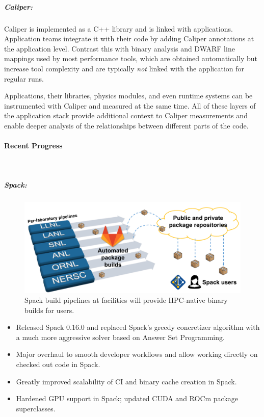 \subparagraph{Caliper:}
Caliper is implemented as a C++ library and is linked with applications.
Application teams integrate it with their code by adding Caliper
annotations at the application level.  Contrast this with binary analysis
and DWARF line mappings used by most performance tools, which are
obtained automatically but increase tool complexity and are typically
{\it not} linked with the application for regular runs.

Applications, their libraries, physics modules, and even runtime systems
can be instrumented with Caliper and measured at the same time.  All of
these layers of the application stack provide additional context to
Caliper measurements and enable deeper analysis of the relationships
between different parts of the code.



\paragraph{Recent Progress} \leavevmode \\


\subparagraph{Spack:}
\begin{figure}[tb]
\centering
\includegraphics[width=.75\textwidth]{projects/2.3.6-NNSA/2.3.6.02-LLNL-ATDM/spack-pipelines.pdf}
\caption{Spack build pipelines at facilities will provide HPC-native binary builds for users.}
\end{figure}


\begin{itemize}
\item Released Spack 0.16.0 and replaced Spack's greedy concretizer algorithm with a
      much more aggressive solver based on Answer Set Programming.
\item Major overhaul to smooth developer workflows and allow working directly on
      checked out code in Spack.
\item Greatly improved scalability of CI and binary cache creation in Spack.
\item Hardened GPU support in Spack; updated CUDA and ROCm package superclasses.
\end{itemize}

